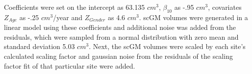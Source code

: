 Coefficients were set on the intercept as 63.135 $cm^3$, $\beta_{10}$ as -.95 $cm^3$, covariates $Z_{Age}$ as -.25 $cm^3$/year and $Z_{Gender}$ as 4.6 $cm^3$. scGM volumes were generated in a linear model using these coefficients and additional noise was added from the  residuals, which were sampled from a normal distribution with zero mean and standard deviation 5.03 $cm^3$. Next, the scGM volumes were scaled by each site's calculated scaling factor and gaussian noise from the residuals of the scaling factor fit of that particular site were added.